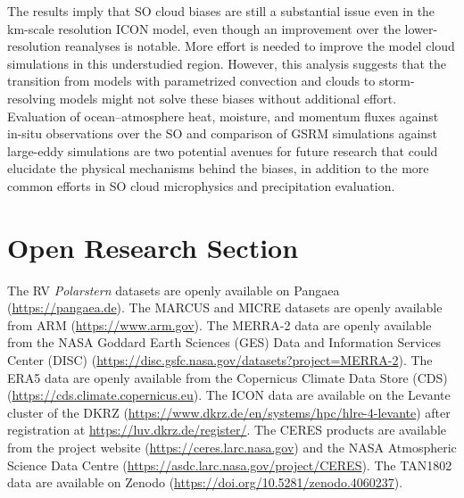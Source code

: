 \documentclass[draft]{agujournal2019}
\begin{document}
The results imply that SO cloud biases are still a substantial issue even in the km-scale resolution ICON model, even though an improvement over the lower-resolution reanalyses is notable. More effort is needed to improve the model cloud simulations in this understudied region. However, this analysis suggests that the transition from models with parametrized convection and clouds to storm-resolving models might not solve these biases without additional effort. Evaluation of ocean--atmosphere heat, moisture, and momentum fluxes against in-situ observations over the SO and comparison of GSRM simulations against large-eddy simulations are two potential avenues for future research that could elucidate the physical mechanisms behind the biases, in addition to the more common efforts in SO cloud microphysics and precipitation evaluation.

\section*{Open Research Section}

The RV \emph{Polarstern} datasets are openly available on Pangaea (\url{https://pangaea.de}). The MARCUS and MICRE datasets are openly available from ARM (\url{https://www.arm.gov}). The MERRA-2 data are openly available from the NASA Goddard Earth Sciences (GES) Data and Information Services Center (DISC) (\url{https://disc.gsfc.nasa.gov/datasets?project=MERRA-2}). The ERA5 data are openly available from the Copernicus Climate Data Store (CDS) (\url{https://cds.climate.copernicus.eu}). The ICON data are available on the Levante cluster of the DKRZ (\url{https://www.dkrz.de/en/systems/hpc/hlre-4-levante}) after registration at \url{https://luv.dkrz.de/register/}. The CERES products are available from the project website (\url{https://ceres.larc.nasa.gov}) and the NASA Atmospheric Science Data Centre (\url{https://asdc.larc.nasa.gov/project/CERES}). The TAN1802 data are available on Zenodo (\url{https://doi.org/10.5281/zenodo.4060237}).


\acknowledgments
\end{document}
